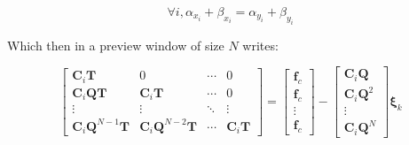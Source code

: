 \[ \forall i, \alpha_{x_i} + \beta_{x_i} = \alpha_{y_i} + \beta_{y_i} \]

\-Which then in a preview window of size $N$ writes\-:

\[ \left[\begin{array}{cccc} \mathbf{C}_i\mathbf{T} & 0 & \cdots & 0 \\ \mathbf{C}_i\mathbf{Q}\mathbf{T} & \mathbf{C}_i\mathbf{T} & \cdots & 0 \\ \vdots & \vdots & \ddots & \vdots \\ \mathbf{C}_i\mathbf{Q}^{N-1}\mathbf{T} & \mathbf{C}_i\mathbf{Q}^{N-2}\mathbf{T} & \cdots & \mathbf{C}_i\mathbf{T} \end{array}\right] = \left[\begin{array}{c} \mathbf{f}_c\\ \mathbf{f}_c\\ \vdots\\ \mathbf{f}_c \end{array}\right] - \left[\begin{array}{c} \mathbf{C}_i\mathbf{Q}\\ \mathbf{C}_i\mathbf{Q}^2\\ \vdots\\ \mathbf{C}_i\mathbf{Q}^N \end{array}\right] \mathbf{\xi}_k \]


